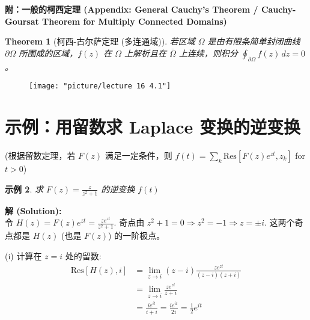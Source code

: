 \documentclass[linespread=1.5,openany]{book}%
\theoremstyle{plain}
\newtheorem{theorem}{Theorem}
\newtheorem{example}[theorem]{示例}
\begin{document}
{{{{{{{									\textbf{附：一般的柯西定理 (Appendix: General Cauchy's Theorem / Cauchy-Goursat Theorem for Multiply Connected Domains)}
									\begin{theorem}[柯西-古尔萨定理 (多连通域)] \label{thm:L16_cauchy_goursat_multiply}
										若区域 $\Omega$ 是由有限条简单封闭曲线 $\partial\Omega$ 所围成的区域，$f(z)$ 在 $\Omega$ 上解析且在 $\overline{\Omega}$ 上连续，则积分 $\oint_{\partial\Omega} f(z) \, dz = 0$。
									\end{theorem}
									
									\begin{figure}[h]
										\centering
										\texttt{[image: "picture/lecture 16 4.1"]}
										\caption{}
										\label{fig:lecture-16-4.1}
									\end{figure}
									
									
									
								} %
								
								\section{示例：用留数求 Laplace 变换的逆变换 }
								{ %
									(根据留数定理，若 $F(z)$ 满足一定条件，则 $f(t) = \sum_{k} \text{Res}[F(z)e^{zt}, z_k]$ for $t>0$)
									
									\begin{example}求 $F(z) = \frac{z}{z^2+1}$ 的逆变换 $f(t)$ \label{ex:L16_inv_laplace_ex1}
									\end{example}
									\noindent\textbf{解 (Solution):} \\
									令 $H(z) = F(z)e^{zt} = \frac{z e^{zt}}{z^2+1}$.
									奇点由 $z^2+1=0 \Rightarrow z^2=-1 \Rightarrow z = \pm i$.
									这两个奇点都是 $H(z)$ (也是 $F(z)$) 的一阶极点。
									
									(i) 计算在 $z=i$ 处的留数:
									\begin{align*}
										\text{Res}[H(z), i] &= \lim_{z\to i} (z-i) \frac{z e^{zt}}{(z-i)(z+i)} \\[6pt]
										&= \lim_{z\to i} \frac{z e^{zt}}{z+i} \\[6pt]
										&= \frac{i e^{it}}{i+i} = \frac{i e^{it}}{2i} = \frac{1}{2}e^{it}
									\end{align*}
									
}}}}}}}
\end{document}
